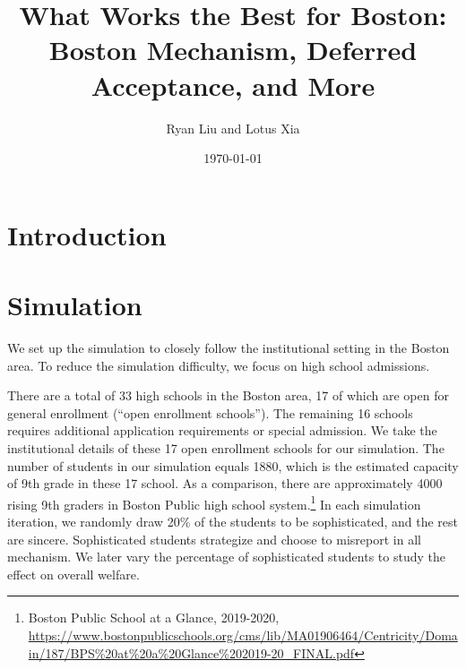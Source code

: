 \documentclass{article}
\title{What Works the Best for Boston: Boston Mechanism, Deferred Acceptance, and More}
\author{Ryan Liu and Lotus Xia}
\date{\today}
\begin{document}
\maketitle






\section{Introduction}

\section{Simulation}
We set up the simulation to closely follow the institutional setting in the Boston area. To reduce the simulation difficulty, we focus on high school admissions. 

There are a total of 33 high schools in the Boston area, 17 of which are open for general enrollment (``open enrollment schools''). The remaining 16 schools requires additional application requirements or special admission. We take the institutional details of these 17 open enrollment schools for our simulation. The number of students in our simulation equals 1880, which is the estimated capacity of 9th grade in these 17 school. As a comparison, there are approximately 4000 rising 9th graders in Boston Public high school system.\footnote{Boston Public School at a Glance, 2019-2020, \url{https://www.bostonpublicschools.org/cms/lib/MA01906464/Centricity/Domain/187/BPS\%20at\%20a\%20Glance\%202019-20\_FINAL.pdf}} In each simulation iteration, we randomly draw 20\% of the students to be sophisticated, and the rest are sincere. Sophisticated students strategize and choose to misreport in all mechanism. We later vary the percentage of sophisticated students to study the effect on overall welfare. 
\end{document}
